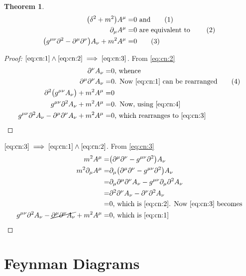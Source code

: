 \documentclass[]{article}
\newcommand\numberthis{\addtocounter{equation}{1}\tag{\theequation}}
\newtheorem{thm}{Theorem}
\begin{document}
\begin{thm}
	\begin{align*}
		\big(\delta^2+m^2\big) A^{\mu}=&0 \text{ and} \numberthis \label{eq:cn:1}\\
		 \partial_{\mu} A^{\mu}=&0 \text{ are equivalent to } \numberthis \label{eq:cn:2}\\
		 \big(g^{\mu\nu}\partial^2-\partial^\mu\partial^\nu\big)A_\nu + m^2 A^\mu=&0 \numberthis \label{eq:cn:3}
	\end{align*}
\end{thm}
\begin{proof}[Proof: $\eqref{eq:cn:1} \land \eqref{eq:cn:2} \implies \eqref{eq:cn:3}$]
	 From	\eqref{eq:cn:2} 
	\begin{align*}
		 \partial^\nu A_\nu =& 0 \text{, whence}\\
		 \partial^\mu \partial^\nu A_\nu =& 0 \text{. Now \eqref{eq:cn:1} can be rearranged} \numberthis \label{eq:cn:4}\\
		 \partial^2 \big(g^{\mu\nu}A_\nu\big) + m^2 A^\mu =&0\\
		 g^{\mu\nu} \partial^2 A_\nu + m^2 A^\mu =&0 \text{. Now, using \eqref{eq:cn:4}}\\
		 g^{\mu\nu} \partial^2 A_\nu - \partial^\mu \partial^\nu A_\nu + m^2 A^\mu =&0 \text{, which rearranges to \eqref{eq:cn:3}}
	\end{align*}
\end{proof}
\begin{proof}[$\eqref{eq:cn:3} \implies \eqref{eq:cn:1} \land \eqref{eq:cn:2}$]
	From \eqref{eq:cn:3}
	\begin{align*}
	 	m^2 A^\mu=&\big(\partial^\mu\partial^\nu-g^{\mu\nu}\partial^2\big)A_\nu \\
	 	m^2 \partial_\mu A^\mu =&\partial_\mu \big(\partial^\mu\partial^\nu-g^{\mu\nu}\partial^2\big)A_\nu\\
	 	=&\partial_\mu\partial^\mu\partial^\nu A_\nu -  g^{\mu\nu}\partial_\mu\partial^2A_\nu\\
	 	=&\partial^2\partial^\nu A_\nu - \partial^\nu\partial^2A_\nu\\
	 	=& 0 \text{, which is \eqref{eq:cn:2}. Now \eqref{eq:cn:3} becomes}\\
	 	g^{\mu\nu}\partial^2 A_\nu-\cancel{\partial^\mu\partial^\nu A_\nu} + m^2 A^\mu=&0 \text{, which is \eqref{eq:cn:1}}
	\end{align*}
\end{proof}

\section{Feynman Diagrams}
\end{document}
